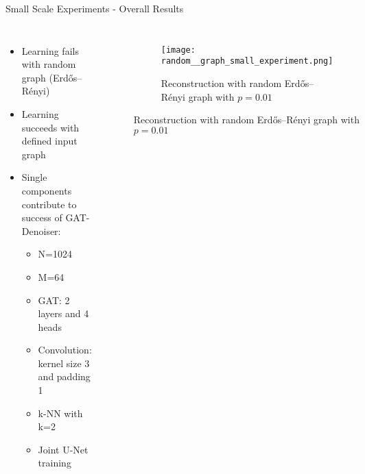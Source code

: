 \begin{frame}{Small Scale Experiments - Overall Results}
    \begin{columns}
        \begin{itemize}
            \item Learning fails with random graph (Erdős–Rényi)
            \item Learning succeeds with defined input graph
            \item<2-> Single components contribute to success of GAT-Denoiser:
            \begin{itemize}
              \item \alert{N=1024}
              \item \alert{M=64}
              \item \alert{GAT: 2 layers and 4 heads}
              \item \alert{Convolution: kernel size 3 and padding 1}
              \item \alert{k-NN with k=2}
              \item \alert{Joint U-Net training}
            \end{itemize}
        \end{itemize}
        \begin{figure}
          \centering
          \begin{subfigure}{0.9\textwidth}
              \centering
              \texttt{[image: random\_\_graph\_small\_experiment.png]}
              \caption{Reconstruction with random Erdős–Rényi graph with $p=0.01$}
          \end{subfigure}\hfill
      \end{figure}
        
    \end{columns}
\end{frame}

